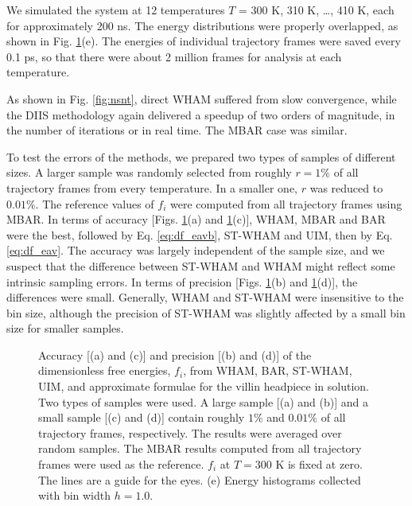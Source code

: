 \documentclass[reprint,aip,jcp,superscriptaddress]{revtex4-1}
\begin{document}
We simulated the system at 12 temperatures
$T$ = 300 K, 310 K, \dots, 410 K,
each for approximately 200 ns.
%
The energy distributions were properly overlapped,
as shown in Fig. \ref{fig:whamcmp}(e).
%
The energies of individual trajectory frames were saved every 0.1 ps,
so that there were about 2 million frames for analysis
at each temperature.



As shown in Fig. \ref{fig:nsnt},
direct WHAM suffered from slow convergence,
while the DIIS methodology again
delivered a speedup of two orders of magnitude,
in the number of iterations or in real time.
%
The MBAR case was similar.
%



To test the errors of the methods,
we prepared two types of samples of different sizes.
%
A larger sample was randomly selected from roughly $r = 1\%$
of all trajectory frames from every temperature.
%
In a smaller one, $r$ was reduced to $0.01\%$.
%
The reference values of $f_i$
were computed from all trajectory frames using MBAR.
%
In terms of accuracy
[Figs. \ref{fig:whamcmp}(a) and \ref{fig:whamcmp}(c)],
WHAM, MBAR and BAR were the best,
followed by Eq. \eqref{eq:df_eavb}, ST-WHAM and UIM,
then by Eq. \eqref{eq:df_eav}.
%
The accuracy was largely independent of the sample size,
and we suspect that the difference
between ST-WHAM and WHAM
might reflect some intrinsic sampling errors.
%
In terms of precision
[Figs. \ref{fig:whamcmp}(b) and \ref{fig:whamcmp}(d)],
the differences were small.
%
Generally,
WHAM and ST-WHAM were insensitive to the bin size,
although the precision of ST-WHAM was slightly affected
by a small bin size for smaller samples.



\begin{figure}[h]
  \caption{
    \label{fig:whamcmp}
    Accuracy [(a) and (c)] and precision [(b) and (d)] of
    the dimensionless free energies, $f_i$,
    from WHAM, BAR, ST-WHAM, UIM, and approximate formulae
    for the villin headpiece in solution.
    Two types of samples were used.
    A large sample [(a) and (b)]
    and
    a small sample [(c) and (d)]
    contain roughly
    $1\%$ and $0.01\%$ of all trajectory frames,
    respectively.
    The results were averaged over random samples.
    The MBAR results computed from all trajectory frames
    were used as the reference.
    $f_i$ at $T = 300$ K is fixed at zero.
    The lines are a guide for the eyes.
    (e) Energy histograms collected
    with bin width $h = 1.0$.
  }
\end{figure}
\end{document}
